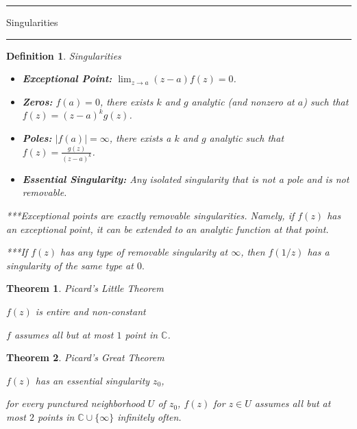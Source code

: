 \documentclass[12pt]{Qual}
\newtheorem{theorem}{Theorem}
\newtheorem{definition}{Definition}
\begin{document}
\newpage








\begin{center}
\noindent\textcolor{blue!60!black}{\rule{15cm}{1mm}}
\Huge \faBug\faPuzzlePiece\faCoffee Singularities \faCoffee\faPuzzlePiece\faBug
\vspace{-0.5cm}
\noindent\textcolor{blue!60!black}{\rule{15cm}{1mm}}
\end{center}
\vspace{0.5cm}
\begin{definition}{\Large\textit{Singularities}}
\begin{itemize}
\renewcommand\labelitemi{\faCoffee}
    \item \textbf{Exceptional Point:} $\displaystyle\lim_{z\to a}(z-a)f(z)=0$.
    \item \textbf{Zeros:} $f(a)=0$, there exists $k$ and $g$ analytic (and nonzero at $a$) such that $f(z)=(z-a)^kg(z)$.
    \item \textbf{Poles:} $|f(a)|=\infty$, there exists a $k$ and $g$ analytic such that $\displaystyle f(z)=\frac{g(z)}{(z-a)^k}$.
    \item \textbf{Essential Singularity:} Any isolated singularity that is not a pole and is not removable.
\end{itemize}


***Exceptional points are exactly removable singularities. Namely, if $f(z)$ has an exceptional point, it can be extended to an analytic function at that point.

***If $f(z)$ has any type of removable singularity at $\infty$, then $f(1/z)$ has a singularity of the \textit{same type} at $0.$


\end{definition}
\vspace{0.5cm}
\begin{theorem}{\Large\textit{Picard's Little Theorem}}

 $f(z)$ is entire and non-constant

 $f$ assumes all but at most $1$ point in $\mathbb{C}$.

\end{theorem}
\vspace{0.5cm}
\begin{theorem}{\Large\textit{Picard's Great Theorem}}

 $f(z)$ has an essential singularity $z_0$,

 for every punctured neighborhood $U$ of $z_0$, $f(z)$ for $z\in U$ assumes all but at most $2$ points in $\mathbb{C}\cup\{\infty\}$ infinitely often.

\end{theorem}
\vspace{0.5cm}
\end{document}
